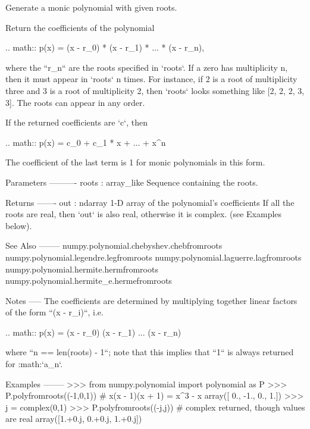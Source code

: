 \begin{DoxyVerb}Generate a monic polynomial with given roots.

Return the coefficients of the polynomial

.. math:: p(x) = (x - r_0) * (x - r_1) * ... * (x - r_n),

where the ``r_n`` are the roots specified in `roots`.  If a zero has
multiplicity n, then it must appear in `roots` n times. For instance,
if 2 is a root of multiplicity three and 3 is a root of multiplicity 2,
then `roots` looks something like [2, 2, 2, 3, 3]. The roots can appear
in any order.

If the returned coefficients are `c`, then

.. math:: p(x) = c_0 + c_1 * x + ... +  x^n

The coefficient of the last term is 1 for monic polynomials in this
form.

Parameters
----------
roots : array_like
    Sequence containing the roots.

Returns
-------
out : ndarray
    1-D array of the polynomial's coefficients If all the roots are
    real, then `out` is also real, otherwise it is complex.  (see
    Examples below).

See Also
--------
numpy.polynomial.chebyshev.chebfromroots
numpy.polynomial.legendre.legfromroots
numpy.polynomial.laguerre.lagfromroots
numpy.polynomial.hermite.hermfromroots
numpy.polynomial.hermite_e.hermefromroots

Notes
-----
The coefficients are determined by multiplying together linear factors
of the form ``(x - r_i)``, i.e.

.. math:: p(x) = (x - r_0) (x - r_1) ... (x - r_n)

where ``n == len(roots) - 1``; note that this implies that ``1`` is always
returned for :math:`a_n`.

Examples
--------
>>> from numpy.polynomial import polynomial as P
>>> P.polyfromroots((-1,0,1)) # x(x - 1)(x + 1) = x^3 - x
array([ 0., -1.,  0.,  1.])
>>> j = complex(0,1)
>>> P.polyfromroots((-j,j)) # complex returned, though values are real
array([1.+0.j,  0.+0.j,  1.+0.j])\end{DoxyVerb}
 \mbox{\label{namespacenumpy_1_1polynomial_1_1polynomial_a8d8c5ed1aff8280b02907c8fa9c3305c}} 

